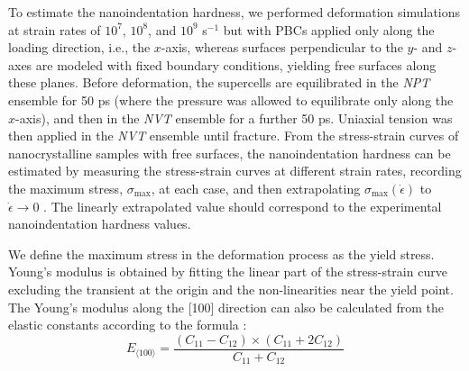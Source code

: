 \documentclass[applsci,article,submit,pdftex,moreauthors]{Definitions/mdpi}
\newcommand{\?}{\stackrel{?}{=}}
\begin{document}
To estimate the nanoindentation hardness, we performed deformation simulations at strain rates of $10^7$, $10^8$, and $10^9$ s$^{-1}$ but with PBCs applied only along the loading direction, i.e., the $x$-axis, whereas surfaces perpendicular to the $y$- and $z$-axes are modeled with fixed boundary conditions, yielding free surfaces along these planes. Before deformation, the supercells are equilibrated in the \textit{NPT} ensemble for 50 ps (where the pressure was allowed to equilibrate only along the $x$-axis), and then in the \textit{NVT} ensemble for a further 50 ps. Uniaxial tension was then applied in the \textit{NVT} ensemble until fracture. From the stress-strain curves of nanocrystalline samples with free surfaces, the nanoindentation hardness can be estimated by measuring the stress-strain curves at different strain rates, recording the maximum stress, $\sigma_\mathrm{max}$, at each case, and then extrapolating $\sigma_\mathrm{max}(\Dot{\epsilon})$ to $\Dot{\epsilon} \rightarrow 0$ \cite{Ivashchenko2007}. The linearly extrapolated value should correspond to the experimental nanoindentation hardness values.

We define the maximum stress in the deformation process as the yield stress. Young's modulus is obtained by fitting the linear part of the stress-strain curve excluding the transient at the origin and the non-linearities near the yield point. The Young's modulus along the [100] direction can also be calculated from the elastic constants according to the formula \cite{Rosler2007}:
\begin{equation}
E_{\langle 100 \rangle} = \frac{(C_{11}-C_{12}) \times (C_{11}+2 C_{12})}{C_{11}+C_{12}}
\label{Eq:E100}
\end{equation}

\end{document}
